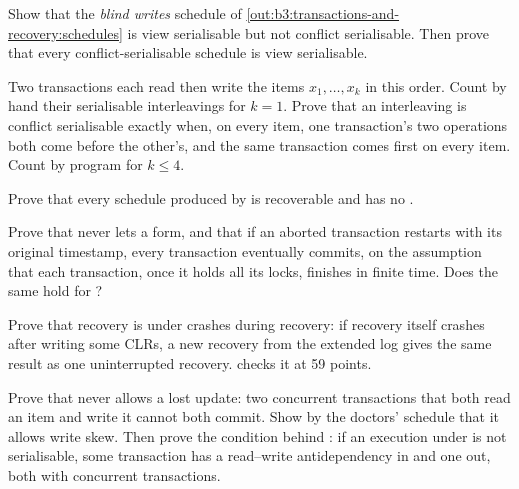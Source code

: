 \begin{exercise}[$\star\star$]\label{exo:b3:transactions-and-recovery:7}
Show that the \emph{blind writes} schedule of \cref{out:b3:transactions-and-recovery:schedules} is view serialisable but not conflict serialisable. Then prove that every conflict-serialisable schedule is view serialisable.
\end{exercise}

\begin{exercise}[$\star\star$]\label{exo:b3:transactions-and-recovery:8}
Two transactions each read then write the items $x_1, \ldots, x_k$ in this order. Count by hand their serialisable interleavings for $k = 1$. Prove that an interleaving is conflict serialisable exactly when, on every item, one transaction's two operations both come before the other's, and the same transaction comes first on every item. Count by program for $k \le 4$.
\end{exercise}

\begin{exercise}[$\star\star$]\label{exo:b3:transactions-and-recovery:9}
Prove that every schedule produced by  is recoverable and has no .
\end{exercise}

\begin{exercise}[$\star\star\star$]\label{exo:b3:transactions-and-recovery:10}
Prove that  never lets a  form, and that if an aborted transaction restarts with its original timestamp, every transaction eventually commits, on the assumption that each transaction, once it holds all its locks, finishes in finite time. Does the same hold for ?
\end{exercise}

\begin{exercise}[$\star\star\star$]\label{exo:b3:transactions-and-recovery:11}
Prove that recovery is  under crashes during recovery: if recovery itself crashes after writing some CLRs, a new recovery from the extended log gives the same result as one uninterrupted recovery.  checks it at 59 points.
\end{exercise}

\begin{exercise}[$\star\star\star$]\label{exo:b3:transactions-and-recovery:12}
Prove that  never allows a lost update: two concurrent transactions that both read an item and write it cannot both commit. Show by the doctors' schedule that it allows write skew. Then prove the condition behind : if an execution under  is not serialisable, some transaction has a read--write antidependency in and one out, both with concurrent transactions.
\end{exercise}

